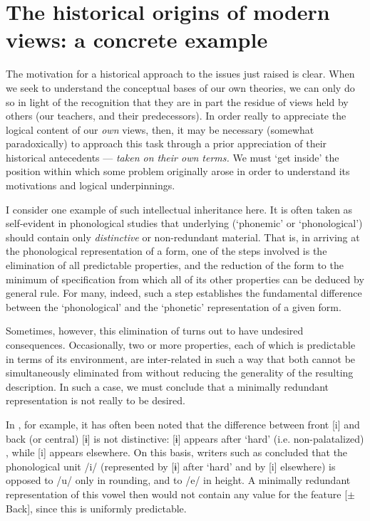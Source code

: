\section*{The historical origins of modern views: a concrete example}

The motivation for a historical approach to the issues just raised is
clear.  When we seek to understand the conceptual bases of our own
theories, we can only do so in light of the recognition that they are
in part the residue of views held by others (our teachers, and their
predecessors). In order really to appreciate the logical content of
our \emph{own} views, then, it may be necessary (somewhat
paradoxically) to approach this task through a prior appreciation of
their historical antecedents --- \emph{taken on their own terms.} We
must `get inside' the position within which some problem originally
arose in order to understand its motivations and logical
underpinnings.

I  consider one example of such intellectual inheritance here.  It
is often taken as self-evident in phonological studies that underlying
(`phonemic' or `phonological')  should contain only
\textit{distinctive} or non-redundant material.  That is, in
arriving at the phonological representation of a form, one of the
steps involved is the elimination of all predictable properties, and
the reduction of the form to the minimum of specification from which
all of its other properties can be deduced by general rule. For many,
indeed, such a step establishes the fundamental difference between the
`phonological' and the `phonetic' representation of a given form.

Sometimes, however, this elimination of  turns out to have
undesired consequences. Occasionally, two or more properties, each of
which is predictable in terms of its environment, are inter-related in
such a way that both cannot be simultaneously eliminated from
 without reducing the generality of the
resulting description.  In such a case, we must conclude that a
minimally redundant representation is not really to be desired.

In , for example, it has often been noted that the difference
between front [i] and back (or central) {[ɨ]} is not
distinctive: {[ɨ]} appears after `hard' (i.e.
non-palatalized) , while [i] appears elsewhere.  On this
basis, writers such as \citet{trubetzkoy39:grundzuge} concluded that the
phonological unit /i/ (represented by {[ɨ]} after `hard'
 and by [i] elsewhere) is opposed to /u/ only in rounding,
and to /e/ in height.  A minimally redundant representation of this
vowel then would not contain any value for the feature [$\pm$Back],
since this is uniformly predictable.

